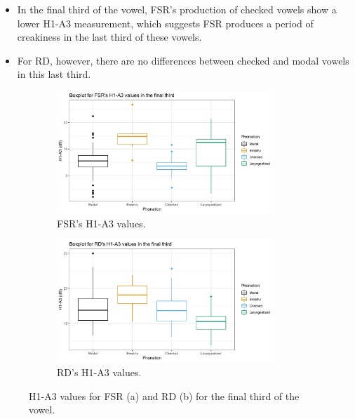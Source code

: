 \documentclass[12pt, letterpaper]{article}
\begin{document}
\begin{itemize}
	\item In the final third of the vowel, FSR's production of checked vowels show a lower H1-A3 measurement, which suggests FSR produces a period of creakiness in the last third of these vowels. 
	\item For RD, however, there are no differences between checked and modal vowels in this last third. 
\end{itemize}

\begin{figure}[!h]
	\centering
	\begin{subfigure}{.5\textwidth}
		\centering
		\includegraphics[width=0.9\textwidth]{../mean_FSR_h1a3_third.png}
		\caption{FSR's H1-A3 values.}
		\label{fig:FSRh1a3third} 
	\end{subfigure}%
	\begin{subfigure}{.5\textwidth}
		\centering
		\includegraphics[width=0.9\textwidth]{../mean_RD_h1a3_third.png}
		\caption{RD's H1-A3 values.}
		\label{fig:RDh1a3third} 
	\end{subfigure}
	\caption{H1-A3 values for FSR (a) and RD (b) for the final third of the vowel. }
	\label{fig:h1a3third}
\end{figure}
\end{document}
